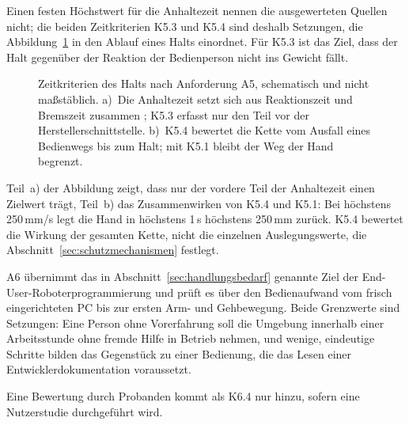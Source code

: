 Einen festen Höchstwert für die Anhaltezeit nennen die ausgewerteten Quellen nicht; die beiden Zeitkriterien K5.3 und K5.4 sind deshalb Setzungen, die Abbildung~\ref{fig:schutzzeiten} in den Ablauf eines Halts einordnet.
Für K5.3 ist das Ziel, dass der Halt gegenüber der Reaktion der Bedienperson nicht ins Gewicht fällt. 

\begin{figure}[!htbp]
  \centering
  
  \caption[Zeitkriterien des Halts nach Anforderung A5]{Zeitkriterien des Halts nach Anforderung A5, schematisch und nicht maßstäblich. a)~Die Anhaltezeit setzt sich aus Reaktionszeit und Bremszeit zusammen \cite{DGUV2015}; K5.3 erfasst nur den Teil vor der Herstellerschnittstelle. b)~K5.4 bewertet die Kette vom Ausfall eines Bedienwegs bis zum Halt; mit K5.1 bleibt der Weg der Hand begrenzt.}
  \label{fig:schutzzeiten}
\end{figure}

Teil~a) der Abbildung zeigt, dass nur der vordere Teil der Anhaltezeit einen Zielwert trägt, Teil~b) das Zusammenwirken von K5.4 und K5.1: Bei höchstens 250\,mm/s legt die Hand in höchstens 1\,s höchstens 250\,mm zurück.
K5.4 bewertet die Wirkung der gesamten Kette, nicht die einzelnen Auslegungswerte, die Abschnitt~\ref{sec:schutzmechanismen} festlegt.

A6 übernimmt das in Abschnitt~\ref{sec:handlungsbedarf} genannte Ziel der End-User-Roboterprogrammierung und prüft es über den Bedienaufwand vom frisch eingerichteten PC bis zur ersten Arm- und Gehbewegung.
Beide Grenzwerte sind Setzungen: Eine Person ohne Vorerfahrung soll die Umgebung innerhalb einer Arbeitsstunde ohne fremde Hilfe in Betrieb nehmen, und wenige, eindeutige Schritte bilden das Gegenstück zu einer Bedienung, die das Lesen einer Entwicklerdokumentation voraussetzt.

Eine Bewertung durch Probanden kommt als K6.4 nur hinzu, sofern eine Nutzerstudie durchgeführt wird.

